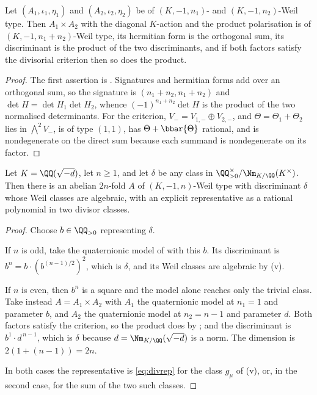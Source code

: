 \begin{lemma}\label{lem:products}
Let $(A_{1},\iota_{1},\eta_{1})$ and $(A_{2},\iota_{2},\eta_{2})$ be of
$(K,-1,n_{1})$- and $(K,-1,n_{2})$-Weil type. Then
$A_{1}\times A_{2}$ with the diagonal $K$-action and the product polarisation
is of $(K,-1,n_{1}+n_{2})$-Weil type, its hermitian form is the orthogonal
sum, its discriminant is the product of the two discriminants, and if both
factors satisfy the divisorial criterion then so does the product.
\end{lemma}

\begin{proof}
The first assertion is . Signatures and hermitian forms add
over an orthogonal sum, so the signature is
$(n_{1}+n_{2},n_{1}+n_{2})$ and $\det H=\det H_{1}\det H_{2}$, whence
$(-1)^{n_{1}+n_{2}}\det H$ is the product of the two normalised determinants.
For the criterion, $V_{-}=V_{1,-}\oplus V_{2,-}$, and
$\Theta=\Theta_{1}+\Theta_{2}$ lies in $\bigwedge^{2}V_{-}$, is of type
$(1,1)$, has $\Theta+\bbar{\Theta}$ rational, and is nondegenerate on the
direct sum because each summand is nondegenerate on its factor.
\end{proof}

\begin{theorem}\label{thm:everyfamily}
Let $K=\QQ(\sqrt{-d})$, let $n\ge1$, and let $\delta$ be any class in
$\QQ^{\times}_{>0}/\Nm_{K/\QQ}(K^{\times})$. Then there is an abelian
$2n$-fold $A$ of $(K,-1,n)$-Weil type with discriminant $\delta$ whose Weil
classes are algebraic, with an explicit representative as a rational
polynomial in two divisor classes.
\end{theorem}

\begin{proof}
Choose $b\in\QQ_{>0}$ representing $\delta$.

If $n$ is odd, take the quaternionic model of  with this $b$.
Its discriminant is $b^{n}=b\cdot(b^{(n-1)/2})^{2}$, which is $\delta$, and
its Weil classes are algebraic by (v).

If $n$ is even, then $b^{n}$ is a square and the model alone reaches only the
trivial class. Take instead $A=A_{1}\times A_{2}$ with $A_{1}$ the
quaternionic model at $n_{1}=1$ and parameter $b$, and $A_{2}$ the
quaternionic model at $n_{2}=n-1$ and parameter $d$. Both factors satisfy the
criterion, so the product does by ; and the discriminant is
$b^{1}\cdot d^{\,n-1}$, which is $\delta$ because $d=\Nm_{K/\QQ}(\sqrt{-d})$ is
a norm. The dimension is $2(1+(n-1))=2n$.

In both cases the representative is \eqref{eq:divrep} for the class
$g_{\mu}$ of (v), or, in the second case, for the sum of
the two such classes.
\end{proof}

